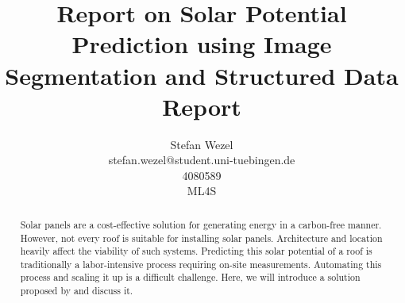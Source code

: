 \documentclass{article} %
\title{Report on Solar Potential Prediction using Image Segmentation and Structured Data\\ \vspace{0.5cm}\large{Report}}
\author{Stefan Wezel \\ stefan.wezel@student.uni-tuebingen.de \\4080589  \\ ML4S}
\def\figwidth{.5\linewidth}
\def\figheight{.15\textheight}
\begin{document}
\maketitle

\begin{abstract}
	Solar panels are a cost-effective solution for generating energy in a carbon-free manner. However, not every roof is suitable for installing solar panels. Architecture and location heavily affect the viability of such systems.
	Predicting this solar potential of a roof is traditionally a labor-intensive process requiring on-site measurements. Automating this process and scaling it up is a difficult challenge. Here, we will introduce a solution proposed by \citet{de2021predicting} and discuss it.
\end{abstract}
\end{document}
